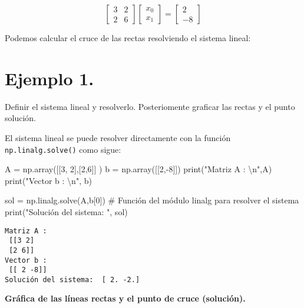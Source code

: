 \documentclass[
  letterpaper,
  DIV=11,
  numbers=noendperiod]{scrreprt}
\newenvironment{Shaded}{\begin{snugshade}}{\end{snugshade}}
\newcommand{\BuiltInTok}[1]{\textcolor[rgb]{0.00,0.23,0.31}{#1}}
\newcommand{\CharTok}[1]{\textcolor[rgb]{0.13,0.47,0.30}{#1}}
\newcommand{\CommentTok}[1]{\textcolor[rgb]{0.37,0.37,0.37}{#1}}
\newcommand{\DecValTok}[1]{\textcolor[rgb]{0.68,0.00,0.00}{#1}}
\newcommand{\NormalTok}[1]{\textcolor[rgb]{0.00,0.23,0.31}{#1}}
\newcommand{\OperatorTok}[1]{\textcolor[rgb]{0.37,0.37,0.37}{#1}}
\newcommand{\StringTok}[1]{\textcolor[rgb]{0.13,0.47,0.30}{#1}}
\begin{document}
\[
\left[
\begin{array}{cc}
3 & 2 \\
2 & 6
\end{array} \right]
\left[
\begin{array}{c}
x_{0} \\
x_{1}
\end{array} \right] =
\left[
\begin{array}{c}
2 \\ 
-8
\end{array} \right]
\tag{1}
\]

Podemos calcular el cruce de las rectas resolviendo el sistema lineal:

\section{\texorpdfstring{\textbf{Ejemplo
1.}}{Ejemplo 1.}}\label{ejemplo-1.-3}

Definir el sistema lineal y resolverlo. Posteriomente graficar las
rectas y el punto solución.

El sistema lineal se puede resolver directamente con la función
\texttt{np.linalg.solve()} como sigue:

\begin{Shaded}
\begin{Highlighting}[]
\NormalTok{A }\OperatorTok{=}\NormalTok{ np.array([[}\DecValTok{3}\NormalTok{, }\DecValTok{2}\NormalTok{],[}\DecValTok{2}\NormalTok{,}\DecValTok{6}\NormalTok{]] )}
\NormalTok{b }\OperatorTok{=}\NormalTok{ np.array([[}\DecValTok{2}\NormalTok{,}\OperatorTok{{-}}\DecValTok{8}\NormalTok{]])}
\BuiltInTok{print}\NormalTok{(}\StringTok{"Matriz A : }\CharTok{\textbackslash{}n}\StringTok{"}\NormalTok{,A)}
\BuiltInTok{print}\NormalTok{(}\StringTok{"Vector b : }\CharTok{\textbackslash{}n}\StringTok{"}\NormalTok{, b)}

\NormalTok{sol }\OperatorTok{=}\NormalTok{ np.linalg.solve(A,b[}\DecValTok{0}\NormalTok{]) }\CommentTok{\# Función del módulo linalg para resolver el sistema}
\BuiltInTok{print}\NormalTok{(}\StringTok{"Solución del sistema: "}\NormalTok{, sol)}
\end{Highlighting}
\end{Shaded}

\begin{verbatim}
Matriz A : 
 [[3 2]
 [2 6]]
Vector b : 
 [[ 2 -8]]
Solución del sistema:  [ 2. -2.]
\end{verbatim}

\textbf{Gráfica de las líneas rectas y el punto de cruce (solución).}
\end{document}
